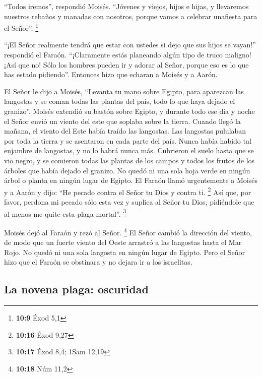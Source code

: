  ``Todos iremos'', respondió Moisés. ``Jóvenes y viejos,
hijos e hijas, y llevaremos nuestros rebaños y manadas con nosotros,
porque vamos a celebrar unafiesta para el Señor''. \footnote{\textbf{10:9}
  Éxod 5,1}

 ``¡El Señor realmente tendrá que estar con ustedes si
dejo que sus hijos se vayan!'' respondió el Faraón. ``¡Claramente estás
planeando algún tipo de truco maligno!  ¡Así que no! Sólo
los hombres pueden ir y adorar al Señor, porque eso es lo que has estado
pidiendo''. Entonces hizo que echaran a Moisés y a Aarón.

 El Señor le dijo a Moisés, ``Levanta tu mano sobre
Egipto, para aparezcan las langostas y se coman todas las plantas del
país, todo lo que haya dejado el granizo''.  Moisés
extendió su bastón sobre Egipto, y durante todo ese día y noche el Señor
envió un viento del este que soplaba sobre la tierra. Cuando llegó la
mañana, el viento del Este había traído las langostas. 
Las langostas pululaban por toda la tierra y se asentaron en cada parte
del país. Nunca había habido tal enjambre de langostas, y no lo habrá
nunca más.  Cubrieron el suelo hasta que se vio negro, y
se comieron todas las plantas de los campos y todos los frutos de los
árboles que había dejado el granizo. No quedó ni una sola hoja verde en
ningún árbol o planta en ningún lugar de Egipto.  El
Faraón llamó urgentemente a Moisés y a Aarón y dijo: ``He pecado contra
el Señor tu Dios y contra ti. \footnote{\textbf{10:16} Éxod 9,27}
 Así que, por favor, perdona mi pecado sólo esta vez y
suplica al Señor tu Dios, pidiéndole que al menos me quite esta plaga
mortal''. \footnote{\textbf{10:17} Éxod 8,4; 1Sam 12,19}

 Moisés dejó al Faraón y rezó al Señor. \footnote{\textbf{10:18}
  Núm 11,2}  El Señor cambió la dirección del viento, de
modo que un fuerte viento del Oeste arrastró a las langostas hasta el
Mar Rojo. No quedó ni una sola langosta en ningún lugar de Egipto.
 Pero el Señor hizo que el Faraón se obstinara y no
dejara ir a los israelitas.

\hypertarget{la-novena-plaga-oscuridad}{%
\subsection{La novena plaga:
oscuridad}\label{la-novena-plaga-oscuridad}}

